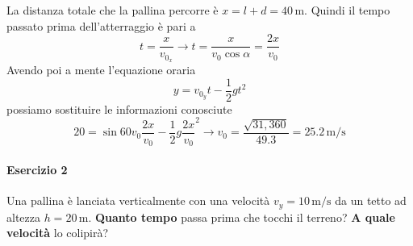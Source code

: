 \begin{center}
\end{center}

\divisor

La distanza totale che la pallina percorre è $x = l + d = 40\,\text{m}$. Quindi il tempo passato prima
dell'atterraggio è pari a 
\begin{equation*}
  t = \frac{x}{v_{0_x}} \rightarrow t = \frac{x}{v_0\cos\alpha} = \frac{2x}{v_0}
\end{equation*}
Avendo poi a mente l'equazione oraria
\begin{equation*}
  y = v_{0_y}t - \frac{1}{2}gt^2
\end{equation*}
possiamo sostituire le informazioni conosciute
\begin{equation*}
  20 = \sin60v_0\frac{2x}{v_0} - \frac{1}{2}g\frac{2x}{v_0}^2 \rightarrow
  v_0 = \frac{\sqrt{31,360}}{49.3} = \boxed{25.2\,\text{m/s}}
\end{equation*}

\paragraph{Esercizio 2}
Una pallina è lanciata verticalmente con una velocità $v_y = 10\,\text{m/s}$ da un tetto ad altezza
$h = 20\,\text{m}$. \textbf{Quanto tempo} passa prima che tocchi il terreno? \textbf{A quale velocità}
lo colipirà?

\divisor

